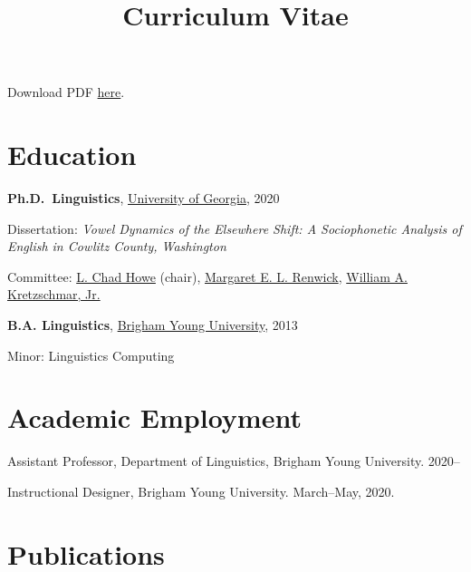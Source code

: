 \documentclass[
]{article}
\title{Curriculum Vitae}
\author{}
\date{}
\begin{document}
\maketitle
\ifdefined\Shaded\renewenvironment{Shaded}{\begin{tcolorbox}[boxrule=0pt, frame hidden, borderline west={3pt}{0pt}{shadecolor}, interior hidden, enhanced, breakable, sharp corners]}{\end{tcolorbox}}\fi

\begin{tcolorbox}[enhanced jigsaw, left=2mm, colback=white, leftrule=.75mm, bottomrule=.15mm, toprule=.15mm, rightrule=.15mm, arc=.35mm, breakable, opacityback=0]

Download PDF \href{/downloads/CV.pdf}{here}.

\end{tcolorbox}

\hypertarget{education}{%
\section{Education}\label{education}}

\textbf{Ph.D.~Linguistics},
\href{http://www.linguistics.uga.edu/}{University of Georgia}, 2020

Dissertation: \emph{Vowel Dynamics of the Elsewhere Shift: A
Sociophonetic Analysis of English in Cowlitz County, Washington}

Committee: \href{https://chadhoweuga.github.io}{L. Chad Howe} (chair),
\href{https://linguistics.uga.edu/directory/people/margaret-e-l-renwick/}{Margaret
E. L. Renwick},
\href{https://www.english.uga.edu/directory/people/william-kretzschmar}{William
A. Kretzschmar, Jr.}

\textbf{B.A. Linguistics}, \href{http://ling.byu.edu/}{Brigham Young
University}, 2013

Minor: Linguistics Computing

\hypertarget{academic-employment}{%
\section{Academic Employment}\label{academic-employment}}

Assistant Professor, Department of Linguistics, Brigham Young
University. 2020--

Instructional Designer, Brigham Young University. March--May, 2020.

\hypertarget{publications}{%
\section{Publications}\label{publications}}
\end{document}
